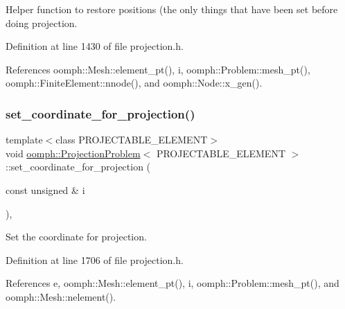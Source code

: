 Helper function to restore positions (the only things that have been set before doing projection. 



Definition at line 1430 of file projection.\+h.



References oomph\+::\+Mesh\+::element\+\_\+pt(), i, oomph\+::\+Problem\+::mesh\+\_\+pt(), oomph\+::\+Finite\+Element\+::nnode(), and oomph\+::\+Node\+::x\+\_\+gen().

\mbox{\label{classoomph_1_1ProjectionProblem_ad8f93fb7e51a0e427b634d4dac8e96a3}} 
\subsubsection{\texorpdfstring{set\+\_\+coordinate\+\_\+for\+\_\+projection()}{set\_coordinate\_for\_projection()}}
{\footnotesize\ttfamily template$<$class P\+R\+O\+J\+E\+C\+T\+A\+B\+L\+E\+\_\+\+E\+L\+E\+M\+E\+NT$>$ \\
void \hyperlink{classoomph_1_1ProjectionProblem}{oomph\+::\+Projection\+Problem}$<$ P\+R\+O\+J\+E\+C\+T\+A\+B\+L\+E\+\_\+\+E\+L\+E\+M\+E\+NT $>$\+::set\+\_\+coordinate\+\_\+for\+\_\+projection (\begin{DoxyParamCaption}\item[{const unsigned \&}]{i }\end{DoxyParamCaption})\hspace{0.3cm}{\ttfamily [inline]}, {\ttfamily [private]}}



Set the coordinate for projection. 



Definition at line 1706 of file projection.\+h.



References e, oomph\+::\+Mesh\+::element\+\_\+pt(), i, oomph\+::\+Problem\+::mesh\+\_\+pt(), and oomph\+::\+Mesh\+::nelement().

\mbox{\label{classoomph_1_1ProjectionProblem_a616f08ea08e8f1ba6be018e966f38830}} 
